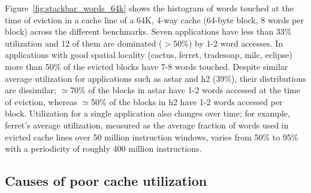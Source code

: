 Figure~\ref{fig:stackbar_words_64k} shows the histogram of words touched at
the time of eviction in a cache line of a 64K, 4-way cache  (64-byte block, 8
words per block) across the different benchmarks.  Seven applications have
less than 33\% utilization and 12 of them are dominated ($>$50\%) by 1-2 word
accesses.  In applications with good spatial locality (cactus, ferret,
tradesoap, milc, eclipse) more than 50\% of the evicted blocks have 7-8 words
touched. Despite similar average utilization for applications such as astar
and h2 (39\%), their distributions are dissimilar; $\simeq$70\% of the blocks
in astar have 1-2 words accessed at the time of eviction,  whereas
$\simeq$50\% of the blocks in h2 have 1-2 words accessed per block.
Utilization for a single application also changes over time; for example,
ferret's  average utilization, measured as the average fraction of words used
in  evicted cache lines over 50 million instruction windows,  varies from 50\%
to 95\% with a periodicity of roughly 400 million instructions.


\subsection{Causes of poor cache utilization}

